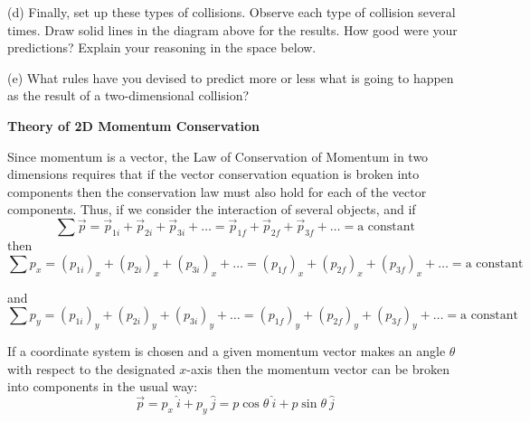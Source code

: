 
(d) Finally, set up these types of collisions. Observe each type of collision
several times. Draw solid lines in the diagram above for the results. How good
were your predictions? Explain your reasoning in the space below.
\answerspace{30mm}

(e) What rules have you devised to predict more or less what is going to happen
as the result of a two-dimensional collision?
\answerspace{15mm}

\pagebreak[3]
\textbf{Theory of 2D Momentum Conservation }

Since momentum is a vector, the Law of Conservation of Momentum in two dimensions
requires that if the vector conservation equation is broken into components
then the conservation law must also hold for each of the vector components.
Thus, if we consider the interaction of several objects, and if 
\[
\sum {\vec p}={{\vec p}_{1i}}+{{\vec p}_{2i}}+{{\vec p}_{3i}}+\ldots ={{\vec p}_{1f}}+{{\vec p}_{2f}}+{{\vec p}_{3f}}+\ldots =\mbox{a constant}\]
then
\[
\sum p_{x}=(p_{1i})_{x}+(p_{2i})_{x}+(p_{3i})_{x}+\ldots = (p_{1f})_{x}+(p_{2f})_{x}+(p_{3f})_{x}+\ldots =
\mbox{a constant}\]


and
\[
\sum p_{y}=(p_{1i})_{y}+(p_{2i})_{y}+(p_{3i})_{y}+\ldots = (p_{1f})_{y}+(p_{2f})_{y}+(p_{3f})_{y}+\ldots =
\mbox{a constant}\]


If a coordinate system is chosen and a given momentum vector makes an angle
\( \theta  \) with respect to the designated $x$-axis then the momentum vector
can be broken into components in the usual way:
\[
{\vec p}=p_{x}~\widehat{i}+p_{y}~\widehat{ j}=p\cos \theta~\widehat{ i}+
p\sin \theta~\widehat{ j}\]




